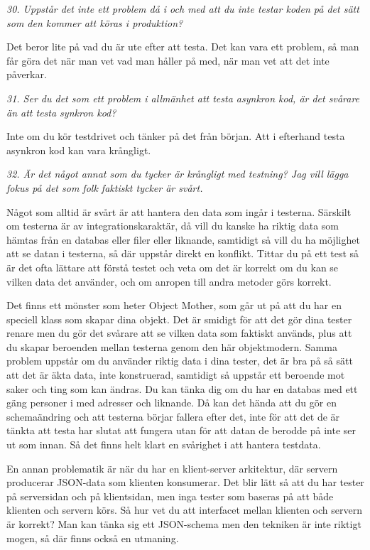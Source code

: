 \documentclass[11pt]{article}
\begin{document}
\emph{30. Uppstår det inte ett problem då i och med att du inte testar koden på det sätt som den kommer att köras i produktion?}

Det beror lite på vad du är ute efter att testa. Det kan vara ett problem, så man får göra det när man vet vad man håller på med, när man vet att det inte påverkar.

\emph{31. Ser du det som ett problem i allmänhet att testa asynkron kod, är det svårare än att testa synkron kod?}

Inte om du kör testdrivet och tänker på det från början. Att i efterhand testa asynkron kod kan vara krångligt.

\emph{32. Är det något annat som du tycker är krångligt med testning? Jag vill lägga fokus på det som folk faktiskt tycker är svårt.}

Något som alltid är svårt är att hantera den data som ingår i testerna. Särskilt om testerna är av integrationskaraktär, då vill du kanske ha riktig data som hämtas från en databas eller filer eller liknande, samtidigt så vill du ha möjlighet att se datan i testerna, så där uppstår direkt en konflikt. Tittar du på ett test så är det ofta lättare att förstå testet och veta om det är korrekt om du kan se vilken data det använder, och om anropen till andra metoder görs korrekt.

Det finns ett mönster som heter Object Mother, som går ut på att du har en speciell klass som skapar dina objekt. Det är smidigt för att det gör dina tester renare men du gör det svårare att se vilken data som faktiskt används, plus att du skapar beroenden mellan testerna genom den här objektmodern. Samma problem uppstår om du använder riktig data i dina tester, det är bra på så sätt att det är äkta data, inte konstruerad, samtidigt så uppstår ett beroende mot saker och ting som kan ändras. Du kan tänka dig om du har en databas med ett gäng personer i med adresser och liknande. Då kan det hända att du gör en schemaändring och att testerna börjar fallera efter det, inte för att det de är tänkta att testa har slutat att fungera utan för att datan de berodde på inte ser ut som innan. Så det finns helt klart en svårighet i att hantera testdata.

En annan problematik är när du har en klient-server arkitektur, där servern producerar JSON-data som klienten konsumerar. Det blir lätt så att du har tester på serversidan och på klientsidan, men inga tester som baseras på att både klienten och servern körs. Så hur vet du att interfacet mellan klienten och servern är korrekt? Man kan tänka sig ett JSON-schema men den tekniken är inte riktigt mogen, så där finns också en utmaning.
\end{document}
